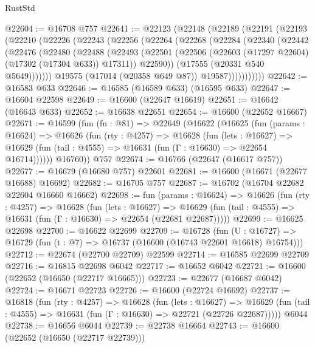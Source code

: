 \begin{lexlean}{RustStd}
\begin{coremodule}
@22604 := @16708 @757
@22641 := @22123
    (@22148
      (@22189
        (@22191
          (@22193
            (@22210
              (@22226
                (@22243
                  (@22256
                    (@22264
                      (@22268
                        (@22284
                          (@22340
                            (@22442
                              (@22476
                                (@22480
                                  (@22488
                                    (@22493
                                      (@22501
                                        (@22506
                                          (@22603 (@17297 @22604) (@17302 (@17304 @633)) @17311))
                                        @22590))
                                    (@17555 (@20331 @540 @5649)))))))
                          @19575
                          (@17014 (@20358 @649 @87))
                          @19587)))))))))))
@22642 := @16583 @633
@22646 := @16585 (@16589 @633) (@16595 @633)
@22647 := @16604 @22598
@22649 := @16600 (@22647 @16619)
@22651 := @16642 (@16643 @633)
@22652 := @16638 @22651
@22654 := @16600 (@22652 @16667)
@22671 := @16599
    (fun (fn : @81) =>
    @22649
      (@16622
        (@16625
          (fun (params : @16624) =>
          @16626
            (fun (rty : @4257) =>
            @16628
              (fun (lets : @16627) =>
              @16629 (fun (tail : @4555) => @16631 (fun (Γ : @16630) => @22654 @16714))))))
        @16760))
    @757
@22674 := @16766 (@22647 (@16617 @757))
@22677 := @16679 (@16680 @757) @22601
@22681 := @16600 (@16671 (@22677 @16688) @16692)
@22682 := @16705 @757
@22687 := @16702 (@16704 @22682 @22604 @16660 @16662)
@22698 := fun (params : @16624) =>
  @16626
    (fun (rty : @4257) =>
    @16628
      (fun (lets : @16627) =>
      @16629 (fun (tail : @4555) => @16631 (fun (Γ : @16630) => @22654 (@22681 @22687)))))
@22699 := @16625 @22698
@22700 := @16622 @22699
@22709 := @16728
    (fun (U : @16727) => @16729 (fun (t : @7) => @16737 (@16600 (@16743 @22601 @16618) @16754)))
@22712 := @22674 (@22700 @22709) @22599
@22714 := @16585 @22699 @22709
@22716 := @16815 @22698 @6042
@22717 := @16652 @6042
@22721 := @16600 (@22652 (@16650 (@22717 @16665)))
@22723 := @22677 (@16687 @6042)
@22724 := @16671 @22723
@22726 := @16600 (@22724 @16692)
@22737 := @16818
    (fun (rty : @4257) =>
    @16628
      (fun (lets : @16627) =>
      @16629 (fun (tail : @4555) => @16631 (fun (Γ : @16630) => @22721 (@22726 @22687)))))
    @6044
@22738 := @16656 @6044
@22739 := @22738 @16664
@22743 := @16600 (@22652 (@16650 (@22717 @22739)))

\end{coremodule}
\end{lexlean}
